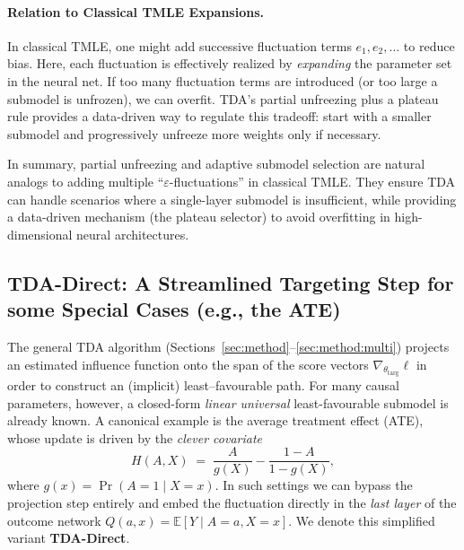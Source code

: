 \documentclass{article}
\theoremstyle{remark}
\newcommand{\E}{\mathbb{E}}
\begin{document}
\paragraph{Relation to Classical TMLE Expansions.}
In classical TMLE, one might add successive fluctuation terms $e_1, e_2,\dots$ to reduce bias.  Here, each fluctuation is effectively realized by \emph{expanding} the parameter set in the neural net.  If too many fluctuation terms are introduced (or too large a submodel is unfrozen), we can overfit.  TDA’s partial unfreezing plus a plateau rule provides a data-driven way to regulate this tradeoff: start with a smaller submodel and progressively unfreeze more weights only if necessary.  
\medskip

\noindent In summary, partial unfreezing and adaptive submodel selection are natural analogs to adding multiple ``$\varepsilon$-fluctuations'' in classical TMLE.  They ensure TDA can handle scenarios where a single-layer submodel is insufficient, while providing a data-driven mechanism (the plateau selector) to avoid overfitting in high-dimensional neural architectures.

\subsection{TDA-Direct:  A Streamlined Targeting Step for some Special Cases (e.g., the ATE)}
\label{sec:tda_direct}

The general TDA algorithm (Sections~\ref{sec:method}–\ref{sec:method:multi})
projects an estimated influence function onto the span of the score vectors
$\nabla_{\theta_{\mathrm{targ}}}\!\ell$ in order to construct an (implicit)
least–favourable path.
For many causal parameters, however, a closed-form \emph{linear universal}
least-favourable submodel is already known.  
A canonical example is the average treatment effect (ATE), whose update is
driven by the \emph{clever covariate}
\[
  H(A,X)\;=\;\frac{A}{g(X)}-\frac{1-A}{1-g(X)} ,
\]
where $g(x)=\Pr(A=1\mid X=x)$.  
In such settings we can bypass the projection step entirely and
embed the fluctuation directly in the \emph{last layer} of the outcome network
$Q(a,x)=\E[Y\mid A=a,X=x]$.  
We denote this simplified variant \textbf{TDA-Direct}.
\end{document}
